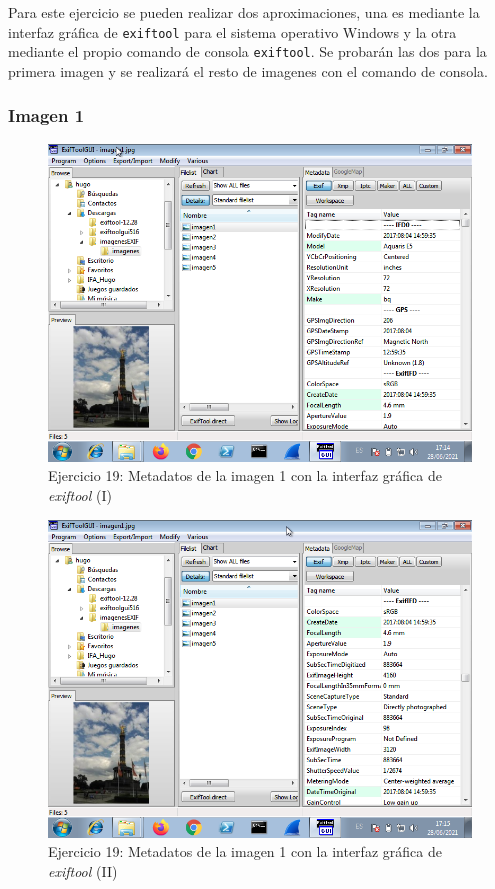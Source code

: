 \documentclass[11pt]{article}
\begin{document}
Para este ejercicio se pueden realizar dos aproximaciones, una es mediante la interfaz gráfica de \verb|exiftool| para el sistema operativo Windows y la otra mediante el propio comando de consola \verb|exiftool|. Se probarán las dos para la primera imagen y se realizará el resto de imagenes con el comando de consola.

\subsubsection{Imagen 1}

\begin{figure}[H]
    \caption{Ejercicio 19: Metadatos de la imagen 1 con la interfaz gráfica de \textit{exiftool} (I)}
    \centering
    \includegraphics[scale=0.7]{p03/e19-1.png}
\end{figure}

\begin{figure}[H]
    \caption{Ejercicio 19: Metadatos de la imagen 1 con la interfaz gráfica de \textit{exiftool} (II)}
    \centering
    \includegraphics[scale=0.7]{p03/e19-2.png}
\end{figure}
\end{document}
